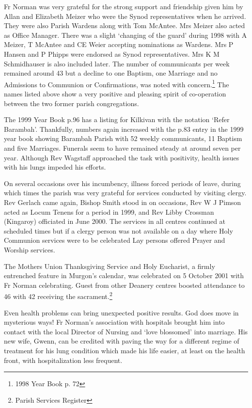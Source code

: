 Fr Norman was very grateful for the strong support and friendship given him by Allan and Elizabeth Meizer who were the Synod representatives when he arrived. They were also Parish Wardens along with Tom McAntee. Mrs Meizer also acted as Office Manager. There was a slight `changing of the guard' during 1998 with A Meizer, T McAntee and CE Weier accepting nominations as Wardens. Mrs P Hansen and P Phipps were endorsed as Synod representatives. Mrs K M Schmidhauser is also included later. The number of communicants per week remained around 43 but a decline to one Baptism, one Marriage and no Admissions to Communion or Confirmations, was noted with concern.\footnote{1998 Year Book p. 72} The names listed above show a very positive and pleasing spirit of co-operation between the two former parish congregations.

The 1999 Year Book p.96 has a listing for Kilkivan with the notation `Refer Barambah'. Thankfully, numbers again increased with the p.83 entry in the 1999 year book showing Barambah Parish with 52 weekly communicants, 11 Baptism and five Marriages. Funerals seem to have remained steady at around seven per year. Although Rev Wagstaff approached the task with positivity, health issues with his lungs impeded his efforts.

On several occasions over his incumbency, illness forced periods of leave, during which times the parish was very grateful for services conducted by visiting clergy. Rev Gerlach came again, Bishop Smith stood in on occasions, Rev W J Pimson acted as Locum Tenens for a period in 1999, and Rev Libby Crossman (Kingaroy) officiated in June 2000. The services in all centres continued at scheduled times but if a clergy person was not available on a day where Holy Communion services were to be celebrated Lay persons offered Prayer and Worship services.

The Mothers Union Thanksgiving Service and Holy Eucharist, a firmly entrenched feature in Murgon's calendar, was celebrated on 5 October 2001 with Fr Norman celebrating. Guest from other Deanery centres boosted attendance to 46 with 42 receiving the sacrament.\footnote{Parish Services Register}

Even health problems can bring unexpected positive results. God does move in mysterious ways! Fr Norman's association with hospitals brought him into contact with the local Director of Nursing and `love blossomed' into marriage. His new wife, Gwenn, can be credited with paving the way for a different regime of treatment for his lung condition which made his life easier, at least on the health front, with hospitalization less frequent.

